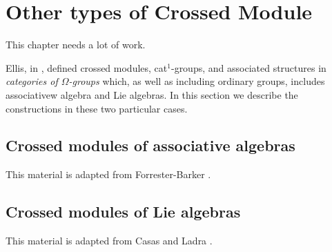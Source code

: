 
\section{Other types of Crossed Module}

This chapter needs a lot of work. 

\bigskip

Ellis, in \cite{ellis-thesis}, defined crossed modules, cat$^1$-groups, 
and associated structures in \emph{categories of $\Omega$-groups} which, 
as well as including ordinary groups, includes associativew algebra 
and Lie algebras. 
In this section we describe the constructions in these two particular cases. 


\subsection{Crossed modules of associative algebras}

This material is adapted from Forrester-Barker \cite{f-b-thesis}.









\subsection{Crossed modules of Lie algebras}

This material is adapted from Casas and Ladra \cite{casas:ladra}.


